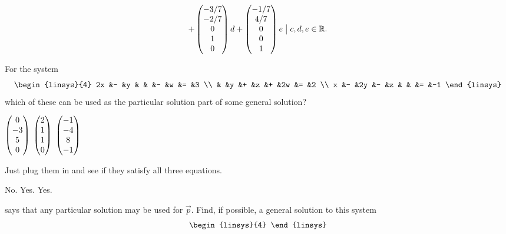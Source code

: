 \begin{exercises}
\begin{answer}
\begin{exparts}
\begin{equation*}
{               +\begin{pmatrix} -3/7 \\ -2/7 \\ 0 \\ 1 \\ 0 \end{pmatrix}d
               +\begin{pmatrix} -1/7 \\ 4/7 \\ 0 \\ 0 \\ 1 \end{pmatrix}e
              \bigm|c,d,e\in\mathbb{R}}.
        \end{equation*}
    \end{exparts}  
   \end{answer}
  \recommended \item 
    For the system
    \begin{equation*}
      \begin{linsys}{4}
       2x  &-  &y  &   &    &-  &w  &=  &3  \\
           &   &y  &+  &z   &+  &2w &=  &2  \\
        x  &-  &2y &-  &z   &   &   &=  &-1
      \end{linsys}
    \end{equation*}
    which of these can be used as the particular solution part of some
    general solution?
    \begin{exparts*}
      \partsitem   \( \begin{pmatrix} 0 \\ -3 \\ 5 \\ 0 \end{pmatrix} \)
      \partsitem   \( \begin{pmatrix} 2 \\ 1 \\ 1 \\ 0 \end{pmatrix} \)
      \partsitem   \( \begin{pmatrix} -1 \\ -4 \\ 8 \\ -1 \end{pmatrix} \)
    \end{exparts*}
    \begin{answer}
      Just plug them in and see if they satisfy all three equations.
      \begin{exparts}
        \partsitem No.
        \partsitem Yes.
        \partsitem Yes.
      \end{exparts}  
    \end{answer}
  \recommended \item  
     says that any particular solution 
    may be used for $\vec{p}$.
    Find, if possible, a general solution to this system
    \begin{equation*}
      \begin{linsys}{4}

\end{linsys}
\end{equation*}
\end{exercises}
